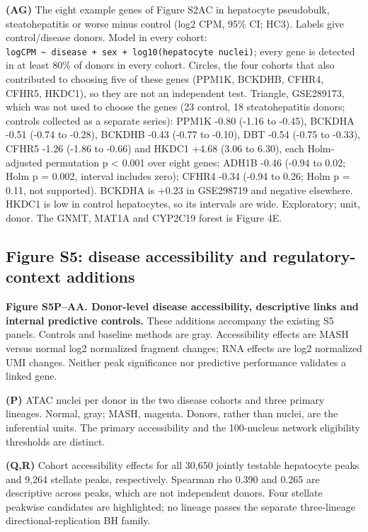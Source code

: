 \textbf{(AG)} The eight example genes of Figure S2AC in hepatocyte pseudobulk, steatohepatitis or worse minus control (log2 CPM, 95\% CI; HC3). Labels give control/disease donors. Model in every cohort: \texttt{logCPM\ \textasciitilde{}\ disease\ +\ sex\ +\ log10(hepatocyte\ nuclei)}; every gene is detected in at least 80\% of donors in every cohort. Circles, the four cohorts that also contributed to choosing five of these genes (PPM1K, BCKDHB, CFHR4, CFHR5, HKDC1), so they are not an independent test. Triangle, GSE289173, which was not used to choose the genes (23 control, 18 steatohepatitis donors; controls collected as a separate series): PPM1K -0.80 (-1.16 to -0.45), BCKDHA -0.51 (-0.74 to -0.28), BCKDHB -0.43 (-0.77 to -0.10), DBT -0.54 (-0.75 to -0.33), CFHR5 -1.26 (-1.86 to -0.66) and HKDC1 +4.68 (3.06 to 6.30), each Holm-adjusted permutation p \textless{} 0.001 over eight genes; ADH1B -0.46 (-0.94 to 0.02; Holm p = 0.002, interval includes zero); CFHR4 -0.34 (-0.94 to 0.26; Holm p = 0.11, not supported). BCKDHA is +0.23 in GSE298719 and negative elsewhere. HKDC1 is low in control hepatocytes, so its intervals are wide. Exploratory; unit, donor. The GNMT, MAT1A and CYP2C19 forest is Figure 4E.

\subsection{Figure S5: disease accessibility and regulatory-context additions}\label{figure-s5-disease-accessibility-and-regulatory-context-additions}

\textbf{Figure S5P--AA. Donor-level disease accessibility, descriptive links and internal predictive controls.} These additions accompany the existing S5 panels. Controls and baseline methods are gray. Accessibility effects are MASH versus normal log2 normalized fragment changes; RNA effects are log2 normalized UMI changes. Neither peak significance nor predictive performance validates a linked gene.

\textbf{(P)} ATAC nuclei per donor in the two disease cohorts and three primary lineages. Normal, gray; MASH, magenta. Donors, rather than nuclei, are the inferential units. The primary accessibility and the 100-nucleus network eligibility thresholds are distinct.

\textbf{(Q,R)} Cohort accessibility effects for all 30,650 jointly testable hepatocyte peaks and 9,264 stellate peaks, respectively. Spearman rho 0.390 and 0.265 are descriptive across peaks, which are not independent donors. Four stellate peakwise candidates are highlighted; no lineage passes the separate three-lineage directional-replication BH family.

